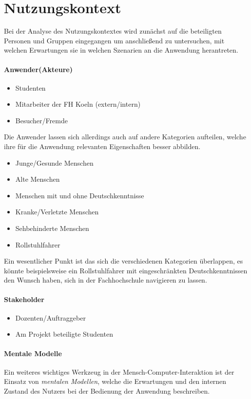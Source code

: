 \chapter{Nutzungskontext}
Bei der Analyse des Nutzungskontextes wird zunächst auf die beteiligten Personen und Gruppen eingegangen um anschließend zu untersuchen, mit welchen Erwartungen sie in welchen Szenarien an die Anwendung herantreten.

\subsubsection*{Anwender(Akteure)}
\begin{itemize}
  \item Studenten
  \item Mitarbeiter der FH Koeln (extern/intern)
  \item Besucher/Fremde
\end{itemize}

\noindent
Die Anwender lassen sich allerdings auch auf andere Kategorien aufteilen, welche ihre für die Anwendung relevanten Eigenschaften besser abbilden.
\begin{itemize}
  \item Junge/Gesunde Menschen
  \item Alte Menschen
  \item Menschen mit und ohne Deutschkenntnisse
  \item Kranke/Verletzte Menschen
  \item Sehbehinderte Menschen
  \item Rollstuhlfahrer
\end{itemize}

\noindent
Ein wesentlicher Punkt ist das sich die verschiedenen Kategorien überlappen, es könnte beispielsweise ein Rollstuhlfahrer mit eingeschränkten Deutschkenntnissen den Wunsch haben, sich in der Fachhochschule navigieren zu lassen.

\subsubsection*{Stakeholder}
\begin{itemize}
  \item Dozenten/Auftraggeber
  \item Am Projekt beteiligte Studenten
\end{itemize}

\subsubsection*{Mentale Modelle}
Ein weiteres wichtiges Werkzeug in der Mensch-\-Computer-\-Interaktion ist der Einsatz von \emph{mentalen Modellen}, welche die Erwartungen und den internen Zustand des Nutzers bei der Bedienung der Anwendung beschreiben. \medskip


